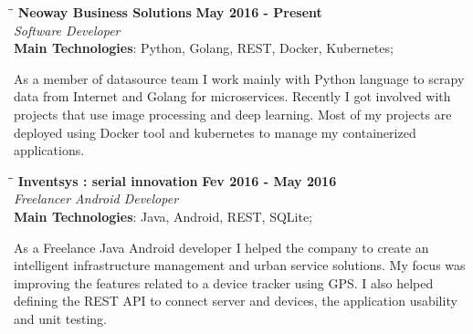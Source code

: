 \documentclass[margin]{res}
\begin{document}
\begin{resume}
\vspace{-0.1in}
   \begin{tabbing}
   \hspace{2.3in}\= \hspace{1.7in}\= \kill %
    \textbf{Neoway Business Solutions}    \>\>\textbf{May 2016 - Present}\\
    \textit{Software Developer}\\        
    \textbf{Main Technologies}: Python, Golang, REST, Docker, Kubernetes;
   \end{tabbing}\vspace{-20pt}      %
    \vspace{2mm}
As a member of datasource team I work mainly with Python language to scrapy data from Internet and Golang for microservices. Recently I got involved with projects that use image processing and deep learning. Most of my projects are deployed using Docker tool and kubernetes to manage my containerized applications.


\vspace{-0.1in}
   \begin{tabbing}
   \hspace{2.3in}\= \hspace{1.7in}\= \kill %
    \textbf{Inventsys : serial innovation}    \>\>\textbf{Fev 2016 - May 2016}\\
    \textit{Freelancer Android Developer}\\        
    \textbf{Main Technologies}: Java, Android, REST, SQLite;
   \end{tabbing}\vspace{-20pt}      %
    \vspace{2mm}
As a Freelance Java Android developer I helped the company to create an intelligent infrastructure management and urban service solutions. My focus was improving the features related to a device tracker using GPS. I also helped defining the REST API to connect server and devices, the application usability and unit testing.




\end{resume}
\end{document}
